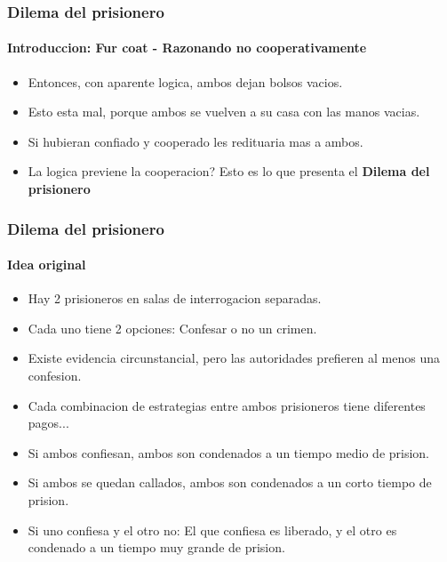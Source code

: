 \documentclass{beamer}
\begin{document}
\begin{frame}
    \frametitle{Dilema del prisionero}
  \framesubtitle{Introduccion: Fur coat - Razonando no cooperativamente}
  \begin{itemize}
    \setlength{\itemsep}{4pt}
    \item Entonces, con aparente logica, ambos dejan bolsos vacios.
    \pause
    \item Esto esta mal, porque ambos se vuelven a su casa con las manos vacias.
    \pause 
    \item Si hubieran confiado y cooperado les redituaria mas a ambos.
    \pause
    \item La logica previene la cooperacion? Esto es lo que presenta el \textbf{Dilema del prisionero}
  \end{itemize}
\end{frame}

\begin{frame}
    \frametitle{Dilema del prisionero}
  \framesubtitle{Idea original}
  \begin{itemize}
    \setlength{\itemsep}{4pt}
    \item Hay 2 prisioneros en salas de interrogacion separadas.
    \pause
    \item Cada uno tiene 2 opciones: Confesar o no un crimen.
    \pause 
    \item Existe evidencia circunstancial, pero las autoridades prefieren al menos una confesion.
    \pause
    \item Cada combinacion de estrategias entre ambos prisioneros tiene diferentes pagos...
    \pause
    \item Si ambos confiesan, ambos son condenados a un tiempo medio de prision.
    \pause
    \item Si ambos se quedan callados, ambos son condenados a un corto tiempo de prision.
    \pause
    \item Si uno confiesa y el otro no: El que confiesa es liberado, y el otro es condenado a un tiempo muy grande de prision.
  \end{itemize}
\end{frame}
\end{document}
